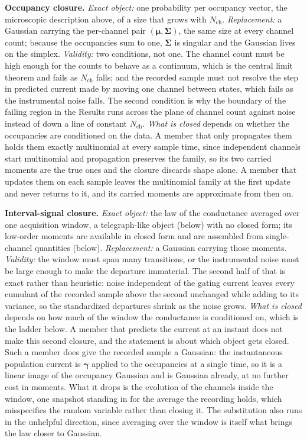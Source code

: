 \begin{tcolorbox}[title={The two Gaussian approximations}, colback=gray!5, colframe=gray!55]
\textbf{Occupancy closure.}
\emph{Exact object:} one probability per occupancy vector, the microscopic description
above, of a size that grows with $N_{\mathrm{ch}}$.
\emph{Replacement:} a Gaussian carrying the per-channel pair $(\bm{\mu},\bm{\Sigma})$, the
same size at every channel count; because the occupancies sum to one, $\bm{\Sigma}$ is
singular and the Gaussian lives on the simplex.
\emph{Validity:} two conditions, not one. The channel count must be high enough for the
counts to behave as a continuum, which is the central limit theorem and fails as
$N_{\mathrm{ch}}$ falls; and the recorded sample must not resolve the step in predicted
current made by moving one channel between states, which fails as the instrumental noise
falls. The second condition is why the boundary of the failing region in the Results runs
across the plane of channel count against noise instead of down a line of constant
$N_{\mathrm{ch}}$.
\emph{What is closed} depends on whether the occupancies are conditioned on the data. A
member that only propagates them holds them exactly multinomial at every sample time, since
independent channels start multinomial and propagation preserves the family, so its two
carried moments are the true ones and the closure discards shape alone. A member that
updates them on each sample leaves the multinomial family at the first update and never
returns to it, and its carried moments are approximate from then on.

\smallskip
\textbf{Interval-signal closure.}
\emph{Exact object:} the law of the conductance averaged over one acquisition window, a
telegraph-like object (below) with no closed form; its low-order moments are available in
closed form and are assembled from single-channel quantities (below).
\emph{Replacement:} a Gaussian carrying those moments.
\emph{Validity:} the window must span many transitions, or the instrumental noise must be
large enough to make the departure immaterial. The second half of that is exact rather than
heuristic: noise independent of the gating current leaves every cumulant of the recorded
sample above the second unchanged while adding to its variance, so the standardized
departures shrink as the noise grows.
\emph{What is closed} depends on how much of the window the conductance is conditioned on,
which is the ladder below. A member that predicts the current at an instant does not make
this second closure, and the statement is about which object gets closed. Such a member
does give the recorded sample a Gaussian: the instantaneous
population current is $\bm{\gamma}$ applied to the occupancies at a single time, so it is a
linear image of the occupancy Gaussian and is Gaussian already, at no further cost in
moments. What it drops is the evolution of the channels inside the window, one snapshot
standing in for the average the recording holds, which misspecifies the random variable
rather than closing it. The substitution also runs in the unhelpful direction, since
averaging over the window is itself what brings the law closer to Gaussian.


\end{tcolorbox}
